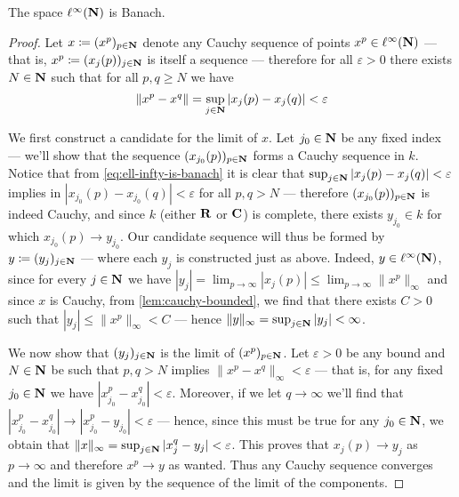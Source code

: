 \begin{proposition}
    \label{prop:ell-infty-is-banach}
    The space \(\ell^{\infty}(\mathbf{N})\) is Banach.
\end{proposition}

\begin{proof}
    Let \(x \coloneq (x^p)_{p \in \mathbf{N}}\) denote any Cauchy sequence of points \(x^p
    \in \ell^{\infty}(\mathbf{N})\) --- that is, \(x^p \coloneq (x_j(p))_{j \in \mathbf{N}}\) is
    itself a sequence --- therefore for all \(\varepsilon > 0\) there exists \(N \in
    \mathbf{N}\) such that for all \(p, q \geq N\) we have
    \begin{equation}\label{eq:ell-infty-is-banach}
        \| x^p - x^q \| = \sup_{j \in \mathbf{N}} |x_j(p) - x_j(q)| < \varepsilon
    \end{equation}

    We first construct a candidate for the limit of \(x\). Let \(j_0 \in \mathbf{N}\) be any
    fixed index --- we'll show that the sequence \((x_{j_0}(p))_{p \in \mathbf{N}}\) forms a
    Cauchy sequence in \(k\). Notice that from \cref{eq:ell-infty-is-banach} it is
    clear that \(\sup_{j \in \mathbf{N}} |x_j(p) - x_j(q)| < \varepsilon\) implies in
    \(|x_{j_0}(p) - x_{j_0}(q)| < \varepsilon\) for all \(p, q > N\) --- therefore
    \((x_{j_0}(p))_{p \in \mathbf{N}}\) is indeed Cauchy, and since \(k\) (either \(\mathbf{R}\) or
    \(\mathbf{C}\)) is complete, there exists \(y_{j_0} \in k\) for which \(x_{j_0}(p) \to
    y_{j_0}\). Our candidate sequence will thus be formed by \(y \coloneq (y_j)_{j
        \in \mathbf{N}}\) --- where each \(y_j\) is constructed just as above. Indeed, \(y \in
    \ell^{\infty}(\mathbf{N})\), since for every \(j \in \mathbf{N}\) we have \(|y_j| = \lim_{p \to
        \infty} |x_j(p)| \leq \lim_{p \to \infty} \| x^p \|_{\infty}\) and since
    \(x\) is Cauchy, from \cref{lem:cauchy-bounded}, we find that there exists \(C >
    0\) such that \(|y_j| \leq \| x^{p} \|_{\infty} < C\) --- hence \(\| y
    \|_{\infty} = \sup_{j \in \mathbf{N}} |y_j| < \infty\).

    We now show that \((y_j)_{j \in \mathbf{N}}\) is the limit of \((x^p)_{p \in \mathbf{N}}\). Let
    \(\varepsilon > 0\) be any bound and \(N \in \mathbf{N}\) be such that \(p, q > N\)
    implies \(\| x^p - x^q \|_{\infty} < \varepsilon\) --- that is, for any fixed
    \(j_0 \in \mathbf{N}\) we have \(|x_{j_0}^p - x_{j_0}^q| < \varepsilon\). Moreover, if
    we let \(q \to \infty\) we'll find that \(|x_{j_0}^p - x_{j_0}^q| \to |x_{j_0}^p
    - y_{j_0}| < \varepsilon\) --- hence, since this must be true for any \(j_0 \in
    \mathbf{N}\), we obtain that \(\| x \|_{\infty} = \sup_{j \in \mathbf{N}} |x_j^q - y_j| <
    \varepsilon\). This proves that \(x_j(p) \to y_j\) as \(p \to \infty\) and
    therefore \(x^p \to y\) as wanted. Thus any Cauchy sequence converges and the
    limit is given by the sequence of the limit of the components.
\end{proof}


